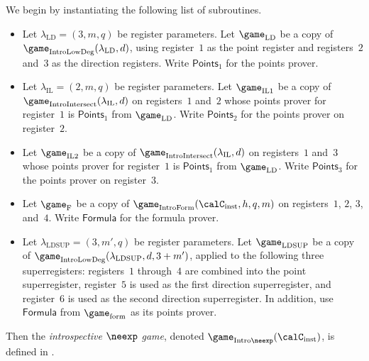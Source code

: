 \begin{definition}
We begin by instantiating the following list of subroutines.
\begin{itemize}
\item[$\circ$]
Let $\lambda_{\mathrm{LD}} = (3, m, q)$ be register parameters.
Let $\game_{\mathrm{LD}}$ be a copy of $\game_{\mathrm{IntroLowDeg}}(\lambda_{\mathrm{LD}}, d)$,
	using register~$1$ as the point register and registers~$2$ and~$3$ as the direction registers.
	Write $\mathsf{Points}_1$ for the points prover.
\item[$\circ$]
Let $\lambda_{\mathrm{IL}} = (2, m, q)$ be register parameters.
Let $\game_{\mathrm{IL1}}$ be a copy of $\game_{\mathrm{IntroIntersect}}(\lambda_{\mathrm{IL}}, d)$ on registers~$1$ and~$2$
	whose points prover for register~$1$ is $\mathsf{Points}_1$ from $\game_{\mathrm{LD}}$.
	Write $\mathsf{Points}_2$ for the points prover on register~$2$.
\item[$\circ$] Let $\game_{\mathrm{IL2}}$ be a copy of
	$\game_{\mathrm{IntroIntersect}}(\lambda_{\mathrm{IL}}, d)$ on registers~$1$ and~$3$
	whose points prover for register~$1$ is $\mathsf{Points}_1$ from $\game_{\mathrm{LD}}$.
	Write $\mathsf{Points}_3$ for the points prover on register~$3$.
\item[$\circ$] Let $\game_{\mathrm{F}}$ be a copy of $\game_{\mathrm{IntroForm}}(\calC_{\mathrm{inst}}, h, q, m)$ on registers~$1$, $2$, $3$, and~$4$.
	Write $\mathsf{Formula}$ for the formula prover.
\item[$\circ$]
Let $\lambda_{\mathrm{LDSUP}} = (3, m', q)$ be register parameters.
Let $\game_{\mathrm{LDSUP}}$ be a copy of $\game_{\mathrm{IntroLowDeg}}(\lambda_{\mathrm{LDSUP}}, d, 3+m')$,
applied to the following three superregisters:
registers~$1$ through~$4$ are combined into the point superregister,
register~$5$ is used as the first direction superregister,
and register~$6$ is used as the second direction superregister.
In addition, use $\mathsf{Formula}$ from $\game_{\mathrm{form}}$ as its points prover.
\end{itemize}
Then the \emph{introspective $\neexp$ game}, denoted $\game_{\mathrm{Intro}\neexp}(\calC_{\mathrm{inst}})$, is defined in .
\end{definition}

